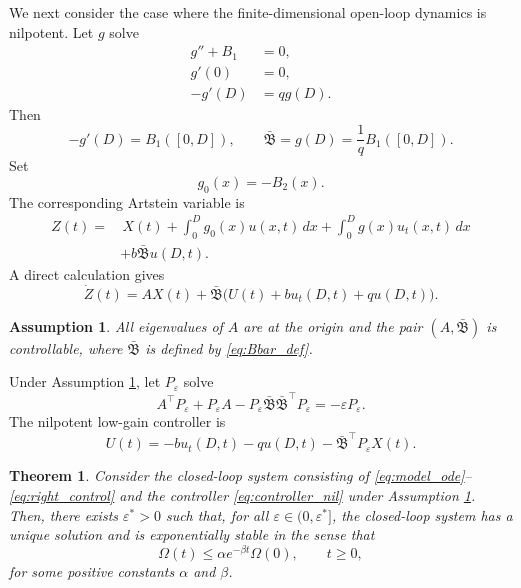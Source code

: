 \documentclass[journal]{IEEEtran}
\newtheorem{theorem}{Theorem}
\newtheorem{assumption}{Assumption}
\newcommand{\eps}{\varepsilon}
\newcommand{\Bbar}{\bar{\mathfrak B}}
\begin{document}
We next consider the case where the finite-dimensional open-loop dynamics is nilpotent. Let $g$ solve
\begin{align}
 g''+B_1&=0,\label{eq:g_nil}\\
 g'(0)&=0,\label{eq:g_nil_left}\\
 -g'(D)&=qg(D).\label{eq:g_nil_right}
\end{align}
Then
\begin{equation}
 -g'(D)=B_1([0,D]),
 \qquad
 \Bbar=g(D)=\frac{1}{q}B_1([0,D]).\label{eq:Bbar_def}
\end{equation}
Set
\begin{equation}
 g_0(x)=-B_2(x).
\end{equation}
The corresponding Artstein variable is
\begin{equation}
\begin{aligned}
 Z(t)=&\,X(t)+\int_0^D g_0(x)u(x,t)\,dx
 +\int_0^D g(x)u_t(x,t)\,dx\\
 &+b\Bbar u(D,t).
\end{aligned}\label{eq:Z_nil}
\end{equation}
A direct calculation gives
\begin{equation}
 \dot Z(t)=AX(t)+\Bbar\big(U(t)+bu_t(D,t)+qu(D,t)\big).\label{eq:Z_nil_target}
\end{equation}

\begin{assumption}\label{ass:nilpotent}
All eigenvalues of $A$ are at the origin and the pair $(A,\Bbar)$ is controllable, where $\Bbar$ is defined by \eqref{eq:Bbar_def}.
\end{assumption}

Under Assumption \ref{ass:nilpotent}, let $P_\eps$ solve
\begin{equation}
 A^\top P_\eps+P_\eps A-P_\eps\Bbar\Bbar^\top P_\eps=-\eps P_\eps.\label{eq:ARE_nil}
\end{equation}
The nilpotent low-gain controller is
\begin{equation}
 U(t)=-bu_t(D,t)-qu(D,t)-\Bbar^\top P_\eps X(t).\label{eq:controller_nil}
\end{equation}

\begin{theorem}\label{thm:nilpotent}
Consider the closed-loop system consisting of \eqref{eq:model_ode}--\eqref{eq:right_control} and the controller \eqref{eq:controller_nil} under Assumption \ref{ass:nilpotent}. Then, there exists $\eps^*>0$ such that, for all $\eps\in(0,\eps^*]$, the closed-loop system has a unique solution and is exponentially stable in the sense that
\begin{equation}
 \Omega(t)\le \alpha e^{-\beta t}\Omega(0),\qquad t\ge0,
\end{equation}
for some positive constants $\alpha$ and $\beta$.
\end{theorem}
\end{document}

